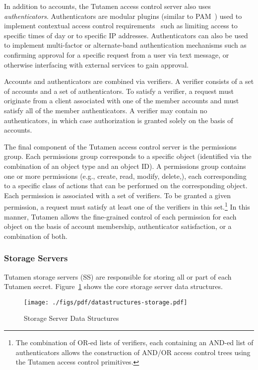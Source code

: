 In addition to accounts, the Tutamen access control server also uses
\textit{authenticators}. Authenticators are modular plugins (similar
to PAM~\cite{samar1996}) used to implement contextual access control
requirements~\cite{hulsebosch2005} such as limiting access to specific
times of day or to specific IP addresses. Authenticators can also be
used to implement multi-factor or alternate-band authentication
mechanisms such as confirming approval for a specific request from a
user via text message, or otherwise interfacing with external services
to gain approval.

Accounts and authenticators are combined via verifiers. A verifier
consists of a set of accounts and a set of authenticators. To satisfy
a verifier, a request must originate from a client associated with one
of the member accounts and must satisfy all of the member
authenticators. A verifier may contain no authenticators, in which
case authorization is granted solely on the basis of accounts.

The final component of the Tutamen access control server is the
permissions group. Each permissions group corresponds to a specific
object (identified via the combination of an object type and an object
ID). A permissions group contains one or more permissions (e.g.,
create, read, modify, delete,), each corresponding to a specific class
of actions that can be performed on the corresponding object. Each
permission is associated with a set of verifiers. To be granted a
given permission, a request must satisfy at least one of the verifiers
in this set.\footnote{The combination of OR-ed lists of verifiers,
  each containing an AND-ed list of authenticators allows the
  construction of AND/OR access control trees using the Tutamen access
  control primitives.} In this manner, Tutamen allows the fine-grained
control of each permission for each object on the basis of account
membership, authenticator satisfaction, or a combination of both.

\subsubsection{Storage Servers}
\label{sec:tutamen:arch:ss}

Tutamen storage servers (SS) are responsible for storing all or part
of each Tutamen secret. Figure~\ref{fig:tutamen:storagestructs} shows
the core storage server data structures.

\begin{figure}[th]
  \centering
  \texttt{[image: ./figs/pdf/datastructures-storage.pdf]}
  \caption{Storage Server Data Structures}
  \label{fig:tutamen:storagestructs}
\end{figure}

